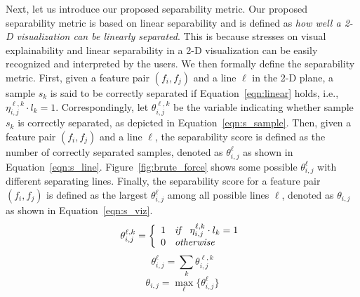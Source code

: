 Next, let us introduce our proposed separability metric. Our proposed separability metric is based on linear separability and is defined as {\em how well a 2-D visualization can be linearly separated}. This is because \genviz stresses on visual explainability and linear separability in a 2-D visualization can be easily recognized and interpreted by the users. We then formally define the separability metric.
First, given a feature pair $(f_i, f_j)$ and a line $\ell$ in the 2-D plane, a sample $s_k$ is said to be correctly separated if Equation~\ref{eqn:linear} holds, i.e., $\eta_{i,j}^{\ell,k}\cdot l_k = 1$. Correspondingly, let $\theta_{i,j}^{\ell,k}$ be the variable indicating whether sample $s_k$ is correctly separated, as depicted in Equation~\ref{eqn:s_sample}. Then, given a feature pair $(f_i, f_j)$ and a line $\ell$, the separability score is defined as the number of correctly separated samples, denoted as $\theta_{i, j}^\ell$ as shown in Equation~\ref{eqn:s_line}. Figure~\ref{fig:brute_force} shows some possible $\theta_{i, j}^\ell$ with different separating lines. Finally, the separability score for a feature pair $(f_i,f_j)$ is defined as the largest $\theta_{i, j}^{\ell}$ among all possible lines $\ell$, denoted as $\theta_{i, j}$ as shown in Equation~\ref{eqn:s_viz}. 
\begin{equation}\label{eqn:s_sample}
\theta_{i,j}^{\ell,k}=\left\{
                \begin{array}{ll}
                  1 \textit{\hspace{2mm} if \hspace{2mm}} \eta_{i,j}^{\ell,k}\cdot l_k = 1\\
                  0 \textit{\hspace{2mm} otherwise \hspace{2mm}} 
                \end{array}
              \right.
\end{equation}
\begin{equation}\label{eqn:s_line}
\theta_{i,j}^{\ell}= \sum_{k}{\theta_{i,j}^{\ell,k}}
\end{equation}
\begin{equation}\label{eqn:s_viz}
\theta_{i,j}= \max_{\ell}\{\theta_{i,j}^{\ell}\}
\end{equation}


